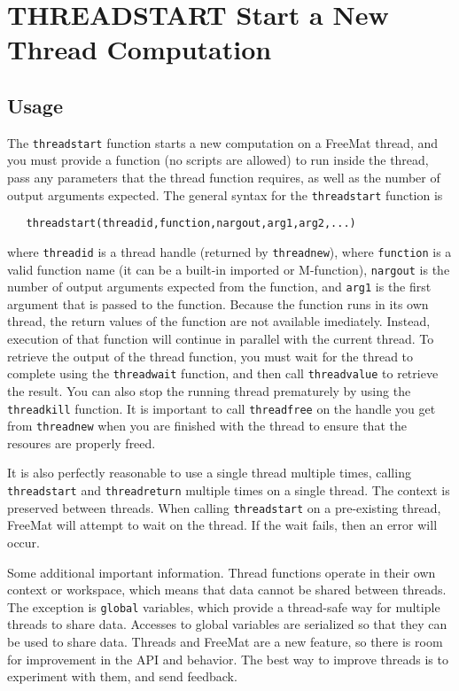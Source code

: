\section{THREADSTART Start a New Thread Computation}

\subsection{Usage}

The \verb|threadstart| function starts a new computation on a
FreeMat thread, and you must provide a function (no scripts 
are allowed) to run inside the thread, pass any parameters that
the thread function requires, as well as the number of output
arguments expected.  The general syntax for the 
\verb|threadstart| function is
\begin{verbatim}
   threadstart(threadid,function,nargout,arg1,arg2,...)
\end{verbatim}
where \verb|threadid| is a thread handle (returned by \verb|threadnew|),
where \verb|function| is a valid function name (it can be a built-in
imported or M-function), \verb|nargout| is the number of output arguments
expected from the function, and \verb|arg1| is the first argument that
is passed to the function.  Because the function runs in its 
own thread, the return values of the function are not available
imediately.  Instead, execution of that function will continue
in parallel with the current thread.  To retrieve the output
of the thread function, you must wait for the thread to complete
using the \verb|threadwait| function, and then call \verb|threadvalue|
 to retrieve the result.  You can also stop the running thread
prematurely by using the \verb|threadkill| function.  It is important
to call \verb|threadfree| on the handle you get from \verb|threadnew|
when you are finished with the thread to ensure that the resoures
are properly freed.  

It is also perfectly reasonable to use a single thread multiple
times, calling \verb|threadstart| and \verb|threadreturn| multiple times
on a single thread.  The context is preserved between threads.
When calling \verb|threadstart| on a pre-existing thread, FreeMat
will attempt to wait on the thread.  If the wait fails, then
an error will occur.

Some additional important information.  Thread functions operate
in their own context or workspace, which means that data cannot
be shared between threads.  The exception is \verb|global| variables,
which provide a thread-safe way for multiple threads to share data.
Accesses to global variables are serialized so that they can 
be used to share data.  Threads and FreeMat are a new feature, so
there is room for improvement in the API and behavior.  The best
way to improve threads is to experiment with them, and send feedback.


